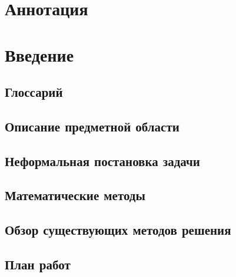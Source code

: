 \documentclass{fefu}
\begin{document}
  \makereporttitle

  \tableofcontents
  \pagebreak

  \section*{Аннотация}
  
  \pagebreak

  \section{Введение}

  \subsection{Глоссарий}
  

  \subsection{Описание предметной области}
  

  \subsection{Неформальная постановка задачи}
  

  \subsection{Математические методы}
  

  \subsection{Обзор существующих методов решения}
  

  \subsection{План работ}
  
\end{document}
